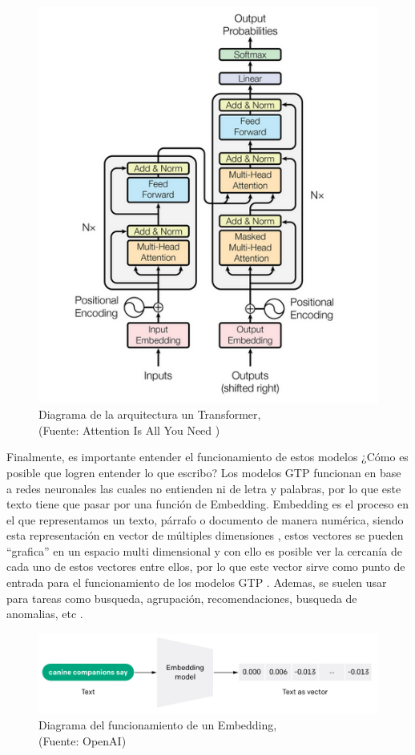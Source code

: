 \begin{figure}[ht!]
    \centering
    \includegraphics[width=.5\textwidth]{figures/ea3.png}
    \caption[Diagrama de la arquitectura un Transformer]{Diagrama de la arquitectura un Transformer,\\
    {\scriptsize (Fuente: Attention Is All You Need \cite{aiayn})}}
    \label{fig:ea4}
\end{figure}

\newpage

Finalmente, es importante entender el funcionamiento de estos modelos ¿Cómo es posible que logren entender lo que escribo? Los modelos 
GTP funcionan en base a redes neuronales las cuales no entienden ni de letra y palabras, por lo que este texto tiene que pasar por
una función de Embedding. Embedding es el proceso en el que representamos un texto, párrafo o documento de manera numérica, siendo
esta representación en vector de múltiples dimensiones \cite{eb1}, estos vectores se pueden ``grafica'' en un espacio multi dimensional y con 
ello es posible ver la cercanía de cada uno de estos vectores entre ellos, por lo que este vector sirve como punto de entrada para
el funcionamiento de los modelos GTP \cite{eb2}. Ademas, se suelen usar para tareas como busqueda, agrupación, recomendaciones, 
busqueda de anomalias, etc \cite{eb3}.

\begin{figure}[ht!]
    \centering
    \includegraphics[width=.8\textwidth]{figures/huemul4.png}
    \caption[Diagrama del funcionamiento de un Embedding]{Diagrama del funcionamiento de un Embedding,\\
    {\scriptsize (Fuente: OpenAI\cite{openai1})}}
    \label{fig:ea5}
\end{figure}


